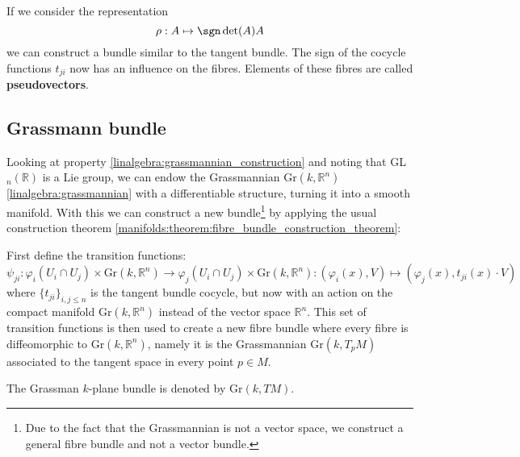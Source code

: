 	\begin{example}[Pseudovectors]
		If we consider the representation
		\begin{equation}
			\rho:A\mapsto \sgn\det(A)A
		\end{equation}
		we can construct a bundle similar to the tangent bundle. The sign of the cocycle functions $t_{ji}$ now has an influence on the fibres. Elements of these fibres are called \textbf{pseudovectors}.
	\end{example}
	
\subsection{Grassmann bundle}

	Looking at property \ref{linalgebra:grassmannian_construction} and noting that GL$_n(\mathbb{R})$ is a Lie group, we can endow the Grassmannian Gr$(k, \mathbb{R}^n)$ \ref{linalgebra:grassmannian} with a differentiable structure, turning it into a smooth manifold. With this we can construct a new bundle\footnote{Due to the fact that the Grassmannian is not a vector space, we construct a general fibre bundle and not a vector bundle.} by applying the usual construction theorem \ref{manifolds:theorem:fibre_bundle_construction_theorem}:
	
	\begin{construct}
		First define the transition functions:
		\begin{equation}
			\psi_{ji}:\varphi_i(U_i\cap U_j)\times \text{Gr}(k, \mathbb{R}^n) \rightarrow \varphi_j(U_i\cap U_j)\times \text{Gr}(k, \mathbb{R}^n):(\varphi_i(x), V)\mapsto(\varphi_j(x), t_{ji}(x)\cdot V)
		\end{equation}
		where $\{t_{ji}\}_{i, j\leq n}$ is the tangent bundle cocycle, but now with an action on the compact manifold Gr$(k, \mathbb{R}^n)$ instead of the vector space $\mathbb{R}^n$. This set of transition functions is then used to create a new fibre bundle where every fibre is diffeomorphic to Gr$(k, \mathbb{R}^n)$, namely it is the Grassmannian Gr$(k, T_pM)$ associated to the tangent space in every point $p\in M$.
	\end{construct}
	\begin{notation}
		The Grassman $k$-plane bundle is denoted by Gr$(k, TM)$.
	\end{notation}
	
	
